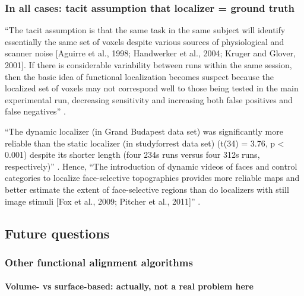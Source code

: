 \subsubsection{In all cases: tacit assumption that localizer = ground truth}


``The tacit assumption is that the same task in the same subject will identify
essentially the same set of voxels despite various sources of physiological and
scanner noise [Aguirre et al., 1998; Handwerker et al., 2004; Kruger and Glover,
2001].
%
If there is considerable variability between runs within the same session, then
the basic idea of functional localization becomes suspect because the localized
set of voxels may not correspond well to those being tested in the main
experimental run, decreasing sensitivity and increasing both false positives and
false negatives'' \citep{duncan2009consistency}.


``The dynamic localizer (in Grand Budapest data set) was significantly more
reliable than the static localizer (in studyforrest data set) (t(34) = 3.76, p <
0.001) despite its shorter length (four 234s runs versus four 312s runs,
respectively)'' \citep{jiahui2020predicting}.
%
Hence, ``The introduction of dynamic videos of faces and control categories to
localize face-selective topographies provides more reliable maps and better
estimate the extent of face-selective regions than do localizers with still
image stimuli [Fox et al., 2009; Pitcher et al., 2011]''
\citep{jiahui2020predicting}.


\subsection{Future questions}


\subsubsection{Other functional alignment algorithms}

\paragraph{Volume- vs surface-based: actually, not a real problem here}

